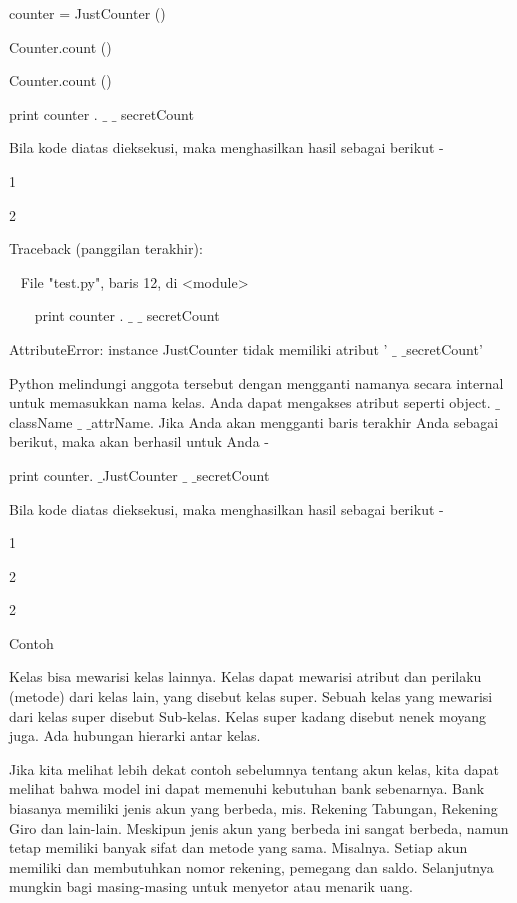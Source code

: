 \vspace{12pt}
counter = JustCounter () \par
Counter.count () \par
Counter.count () \par
print counter . $  \_  $ $  \_  $ secretCount \par
\vspace{12pt}
Bila kode diatas dieksekusi, maka menghasilkan hasil sebagai berikut - \par
\vspace{12pt}
1 \par
2 \par
Traceback (panggilan terakhir): \par
~ File "test.py", baris 12, di <module> \par
~~~ print counter . $  \_  $ $  \_  $ secretCount \par
AttributeError: instance JustCounter tidak memiliki atribut ' $  \_  $ $  \_  $secretCount' \par
\vspace{12pt}
Python melindungi anggota tersebut dengan mengganti namanya secara internal untuk memasukkan nama kelas. Anda dapat mengakses atribut seperti object. $  \_  $className $  \_  $ $  \_  $attrName. Jika Anda akan mengganti baris terakhir Anda sebagai berikut, maka akan berhasil untuk Anda - \par
\vspace{12pt}
print counter. $  \_  $JustCounter $  \_  $ $  \_  $secretCount \par
Bila kode diatas dieksekusi, maka menghasilkan hasil sebagai berikut - \par
\vspace{12pt}
1 \par
2 \par
2 \par
\vspace{12pt}
Contoh \par
\vspace{12pt}
Kelas bisa mewarisi kelas lainnya. Kelas dapat mewarisi atribut dan perilaku (metode) dari kelas lain, yang disebut kelas super. Sebuah kelas yang mewarisi dari kelas super disebut Sub-kelas. Kelas super kadang disebut nenek moyang juga. Ada hubungan hierarki antar kelas. \par
Jika kita melihat lebih dekat contoh sebelumnya tentang akun kelas, kita dapat melihat bahwa model ini dapat memenuhi kebutuhan bank sebenarnya. Bank biasanya memiliki jenis akun yang berbeda, mis. Rekening Tabungan, Rekening Giro dan lain-lain. Meskipun jenis akun yang berbeda ini sangat berbeda, namun tetap memiliki banyak sifat dan metode yang sama. Misalnya. Setiap akun memiliki dan membutuhkan nomor rekening, pemegang dan saldo. Selanjutnya mungkin bagi masing-masing untuk menyetor atau menarik uang. \par
